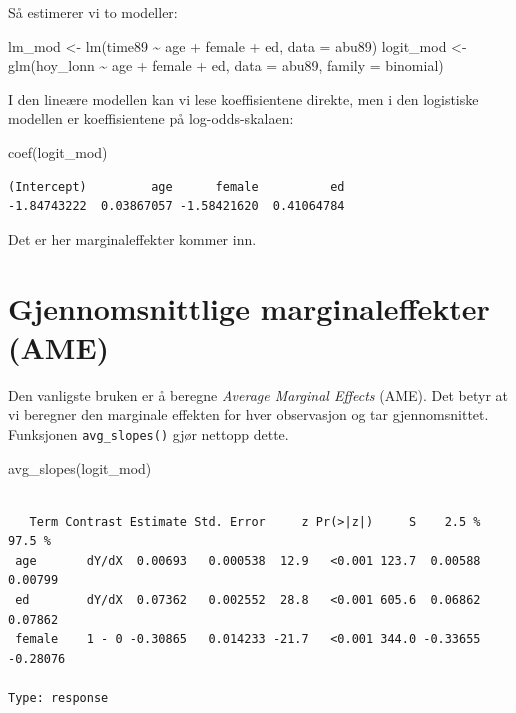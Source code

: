 \documentclass[
  norsk,
  letterpaper,
  DIV=11,
  numbers=noendperiod]{scrreprt}
\newenvironment{Shaded}{\begin{snugshade}}{\end{snugshade}}
\newcommand{\AttributeTok}[1]{\textcolor[rgb]{0.40,0.45,0.13}{#1}}
\newcommand{\FunctionTok}[1]{\textcolor[rgb]{0.28,0.35,0.67}{#1}}
\newcommand{\NormalTok}[1]{\textcolor[rgb]{0.00,0.23,0.31}{#1}}
\newcommand{\OtherTok}[1]{\textcolor[rgb]{0.00,0.23,0.31}{#1}}
\newcommand{\SpecialCharTok}[1]{\textcolor[rgb]{0.37,0.37,0.37}{#1}}
\theoremstyle{definition}
\theoremstyle{remark}
\begin{document}
Så estimerer vi to modeller:

\begin{Shaded}
\begin{Highlighting}[]
\NormalTok{lm\_mod }\OtherTok{\textless{}{-}} \FunctionTok{lm}\NormalTok{(time89 }\SpecialCharTok{\textasciitilde{}}\NormalTok{ age }\SpecialCharTok{+}\NormalTok{ female }\SpecialCharTok{+}\NormalTok{ ed, }\AttributeTok{data =}\NormalTok{ abu89)}
\NormalTok{logit\_mod }\OtherTok{\textless{}{-}} \FunctionTok{glm}\NormalTok{(hoy\_lonn }\SpecialCharTok{\textasciitilde{}}\NormalTok{ age }\SpecialCharTok{+}\NormalTok{ female }\SpecialCharTok{+}\NormalTok{ ed,}
                 \AttributeTok{data =}\NormalTok{ abu89, }\AttributeTok{family =}\NormalTok{ binomial)}
\end{Highlighting}
\end{Shaded}

I den lineære modellen kan vi lese koeffisientene direkte, men i den
logistiske modellen er koeffisientene på log-odds-skalaen:

\begin{Shaded}
\begin{Highlighting}[]
\FunctionTok{coef}\NormalTok{(logit\_mod)}
\end{Highlighting}
\end{Shaded}

\begin{verbatim}
(Intercept)         age      female          ed 
-1.84743222  0.03867057 -1.58421620  0.41064784 
\end{verbatim}

Det er her marginaleffekter kommer inn.

\section{Gjennomsnittlige marginaleffekter
(AME)}\label{gjennomsnittlige-marginaleffekter-ame}

Den vanligste bruken er å beregne \emph{Average Marginal Effects} (AME).
Det betyr at vi beregner den marginale effekten for hver observasjon og
tar gjennomsnittet. Funksjonen \texttt{avg\_slopes()} gjør nettopp
dette.

\begin{Shaded}
\begin{Highlighting}[]
\FunctionTok{avg\_slopes}\NormalTok{(logit\_mod)}
\end{Highlighting}
\end{Shaded}

\begin{verbatim}

   Term Contrast Estimate Std. Error     z Pr(>|z|)     S    2.5 %   97.5 %
 age       dY/dX  0.00693   0.000538  12.9   <0.001 123.7  0.00588  0.00799
 ed        dY/dX  0.07362   0.002552  28.8   <0.001 605.6  0.06862  0.07862
 female    1 - 0 -0.30865   0.014233 -21.7   <0.001 344.0 -0.33655 -0.28076

Type: response
\end{verbatim}
\end{document}
